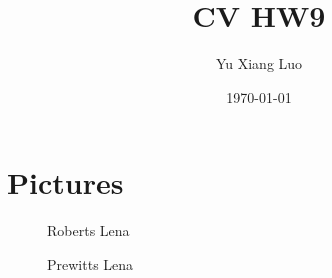 \documentclass{article}
\begin{document}
\title{CV HW9}
\author{Yu Xiang Luo}
\date{\today}
\maketitle

\section*{Pictures}
\begin{figure}[h]
    \centering
    \begin{minipage}{.3\textwidth}
        \centering
        \caption*{Roberts Lena}
    \end{minipage}%
    \begin{minipage}{.3\textwidth}
        \centering
        \caption*{Prewitts Lena}
    \end{minipage}
\end{figure}
\end{document}
